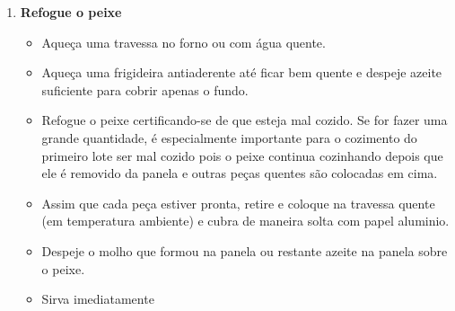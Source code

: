 \documentclass [11pt, papel de carta] {article}
\newcommand \fileName {FishWithEssaouiraChermoula}
\begin{document}
\begin {description}
\begin {enumerate}
\begin {itemize}
\item Cubra o peixe com uma folha e deixe descansar, à temperatura ambiente, por duas horas.
\end {itemize}
\item {\bf Refogue o peixe}
\begin {itemize}
\item Aqueça uma travessa no forno ou com água quente.
\item Aqueça uma frigideira antiaderente até ficar bem quente e despeje azeite suficiente para cobrir apenas o fundo.
\item Refogue o peixe certificando-se de que esteja mal cozido. Se for fazer uma grande quantidade, é especialmente importante para o cozimento do primeiro lote ser mal cozido pois o peixe continua cozinhando depois que ele é removido da panela e outras peças quentes são colocadas em cima.
\item Assim que cada peça estiver pronta, retire e coloque  na travessa quente (em temperatura ambiente) e cubra de maneira solta com papel aluminio.
\item Despeje o molho que formou na panela ou restante azeite na panela sobre o peixe.
\item Sirva imediatamente
\end {itemize}
\end {enumerate}
\end {description}

\end{document}
